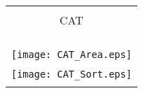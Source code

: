 
\newpage


 \begin{tabular}{c} 
\\
\\
 \huge{CAT} \\
\\
\hline
 \\
 \\
 \\
 \texttt{[image: CAT\_Area.eps]} \\
 \\
 \texttt{[image: CAT\_Sort.eps]} \\
\\
 \end{tabular} 

